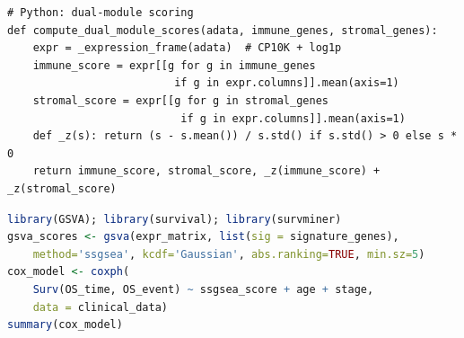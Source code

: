 \documentclass[12pt, a4paper]{article}
\begin{document}
\begin{lstlisting}[caption={Dual-module score computation (Python) and ssGSEA scoring (R)}]
# Python: dual-module scoring
def compute_dual_module_scores(adata, immune_genes, stromal_genes):
    expr = _expression_frame(adata)  # CP10K + log1p
    immune_score = expr[[g for g in immune_genes
                          if g in expr.columns]].mean(axis=1)
    stromal_score = expr[[g for g in stromal_genes
                           if g in expr.columns]].mean(axis=1)
    def _z(s): return (s - s.mean()) / s.std() if s.std() > 0 else s * 0
    return immune_score, stromal_score, _z(immune_score) + _z(stromal_score)
\end{lstlisting}

\begin{lstlisting}[language=R, caption={ssGSEA and multivariate Cox regression (R)}]
library(GSVA); library(survival); library(survminer)
gsva_scores <- gsva(expr_matrix, list(sig = signature_genes),
    method='ssgsea', kcdf='Gaussian', abs.ranking=TRUE, min.sz=5)
cox_model <- coxph(
    Surv(OS_time, OS_event) ~ ssgsea_score + age + stage,
    data = clinical_data)
summary(cox_model)
\end{lstlisting}



\end{document}
